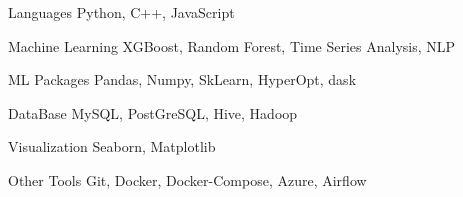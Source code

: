 
\begin{cvskills}
  \cvskill
    {Languages} %
    {Python, C++, JavaScript} %
    
  \cvskill
    {Machine Learning} %
    {XGBoost, Random Forest, Time Series Analysis, NLP} %
    
  \cvskill
    {ML Packages} %
    {Pandas, Numpy, SkLearn, HyperOpt, dask} %
    
  \cvskill
    {DataBase} %
    {MySQL, PostGreSQL, Hive, Hadoop} %
    
  \cvskill
    {Visualization} %
    {Seaborn, Matplotlib} %

  \cvskill
    {Other Tools} %
    {Git, Docker, Docker-Compose, Azure, Airflow} %
\end{cvskills}
